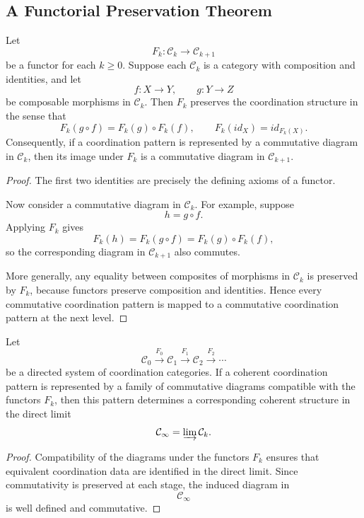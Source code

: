 \documentclass[12pt]{article}
\begin{document}
\subsection{A Functorial Preservation Theorem}

\begin{theorem}
Let
\[
F_k : \mathcal{C}_k \rightarrow \mathcal{C}_{k+1}
\]
be a functor for each $k \ge 0$. Suppose each $\mathcal{C}_k$ is a category with composition and identities, and let
\[
f : X \rightarrow Y,
\qquad
g : Y \rightarrow Z
\]
be composable morphisms in $\mathcal{C}_k$. Then $F_k$ preserves the coordination structure in the sense that
\[
F_k(g \circ f) = F_k(g) \circ F_k(f),
\qquad
F_k(id_X) = id_{F_k(X)}.
\]
Consequently, if a coordination pattern is represented by a commutative diagram in $\mathcal{C}_k$, then its image under $F_k$ is a commutative diagram in $\mathcal{C}_{k+1}$.
\end{theorem}

\begin{proof}
The first two identities are precisely the defining axioms of a functor.

Now consider a commutative diagram in $\mathcal{C}_k$. For example, suppose
\[
h = g \circ f .
\]
Applying $F_k$ gives
\[
F_k(h) = F_k(g \circ f) = F_k(g)\circ F_k(f),
\]
so the corresponding diagram in $\mathcal{C}_{k+1}$ also commutes.

More generally, any equality between composites of morphisms in $\mathcal{C}_k$ is preserved by $F_k$, because functors preserve composition and identities. Hence every commutative coordination pattern is mapped to a commutative coordination pattern at the next level.
\end{proof}

\begin{corollary}
Let
\[
\mathcal{C}_0 \xrightarrow{F_0} \mathcal{C}_1 \xrightarrow{F_1} \mathcal{C}_2 \xrightarrow{F_2} \cdots
\]
be a directed system of coordination categories. If a coherent coordination pattern is represented by a family of commutative diagrams compatible with the functors $F_k$, then this pattern determines a corresponding coherent structure in the direct limit
\[
\mathcal{C}_\infty = \varinjlim \mathcal{C}_k .
\]
\end{corollary}

\begin{proof}
Compatibility of the diagrams under the functors $F_k$ ensures that equivalent coordination data are identified in the direct limit. Since commutativity is preserved at each stage, the induced diagram in
\[
\mathcal{C}_\infty
\]
is well defined and commutative.
\end{proof}
\end{document}
